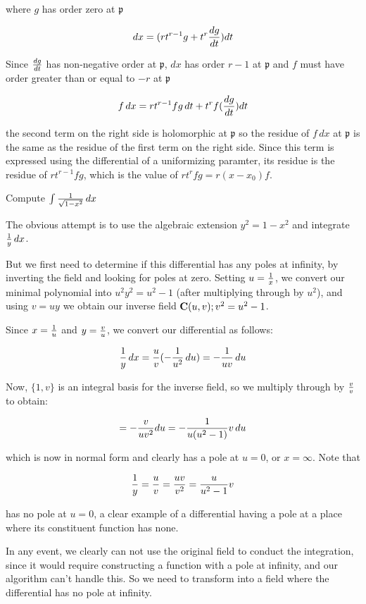 where $g$ has order zero at $\mathfrak{p}$

$$dx = (rt^{r-1}g + t^r{{dg}\over{dt}})dt$$

Since ${dg}\over{dt}$ has non-negative order at $\mathfrak{p}$,
$dx$ has order $r-1$ at $\mathfrak{p}$ and $f$ must have order
greater than or equal to $-r$ at $\mathfrak{p}$

$$f\,dx = rt^{r-1}f g\, dt + t^rf({{dg}\over{dt}})dt$$

the second term on the right side is holomorphic at $\mathfrak{p}$ so
the residue of $f\,dx$ at $\mathfrak{p}$ is the same as the residue of
the first term on the right side.  Since this term is expressed using
the differential of a uniformizing paramter, its residue is the
residue of $rt^{r-1}fg$, which is the value of $rt^rfg = r(x-x_0)f$.

\endtheorem

\vfill\eject

\example Compute $\int {1\over{\sqrt{1-x^2}}} \,dx$

The obvious attempt is to use the algebraic extension $y^2=1-x^2$ and
integrate ${1\over y}\,dx$.

But we first need to determine if this differential has any poles at
infinity, by inverting the field and looking for poles at zero.
Setting $u={1\over x}$, we convert our minimal polynomial into
$u^2y^2=u^2-1$ (after multiplying through by $u^2$), and using
$v=uy$ we obtain our inverse field ${\bf C}(u,v); v^2=u^2-1$.

Since $x={1\over u}$ and $y={v\over u}$, we convert our differential as follows:

 $${1\over y}\,dx ={u\over v} (-{1\over{u^2}} \, du) = -{1\over{uv}} \, du$$

Now, $\{1, v\}$ is an integral basis for the inverse field, so we
multiply through by $v\over v$ to obtain:

 $$= -{v\over{uv^2}} du = -{1\over{u(u^2-1)}}v \, du $$

which is now in normal form and clearly has a pole at $u=0$, or $x=\infty$.  Note that

 $${1\over y} = {u\over v} = {{uv}\over{v^2}}
 = {u\over{u^2-1}} v$$

has no pole at $u=0$, a clear example of a differential having a pole
at a place where its constituent function has none.

In any event, we clearly can not use the original field to conduct the
integration, since it would require constructing a function with a
pole at infinity, and our algorithm can't handle this.  So we need to
transform into a field where the differential has no pole at infinity.

